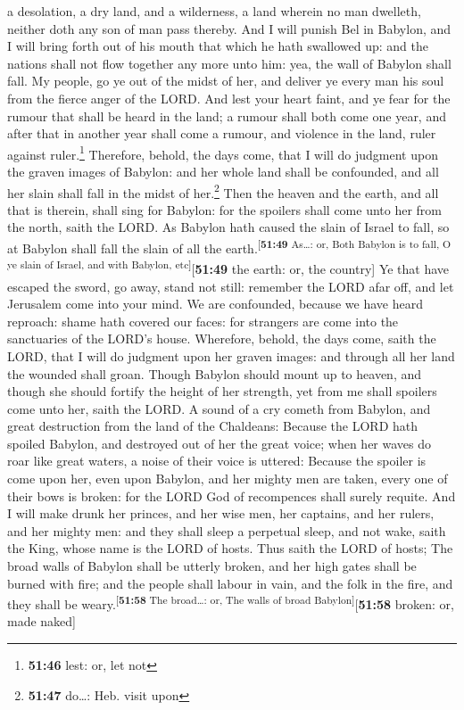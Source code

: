 a desolation, a dry land, and a wilderness, a land wherein no man
dwelleth, neither doth any son of man pass thereby.  And
I will punish Bel in Babylon, and I will bring forth out of his mouth
that which he hath swallowed up: and the nations shall not flow together
any more unto him: yea, the wall of Babylon shall fall. 
My people, go ye out of the midst of her, and deliver ye every man his
soul from the fierce anger of the LORD.  And lest your
heart faint, and ye fear for the rumour that shall be heard in the land;
a rumour shall both come one year, and after that in another year shall
come a rumour, and violence in the land, ruler against ruler.\footnote{\textbf{51:46}
  lest: or, let not}  Therefore, behold, the days come,
that I will do judgment upon the graven images of Babylon: and her whole
land shall be confounded, and all her slain shall fall in the midst of
her.\footnote{\textbf{51:47} do\ldots: Heb. visit upon} 
Then the heaven and the earth, and all that is therein, shall sing for
Babylon: for the spoilers shall come unto her from the north, saith the
LORD.  As Babylon hath caused the slain of Israel to
fall, so at Babylon shall fall the slain of all the
earth.\textsuperscript{{[}\textbf{51:49} As\ldots: or, Both Babylon is
to fall, O ye slain of Israel, and with Babylon,
etc{]}}{[}\textbf{51:49} the earth: or, the country{]} 
Ye that have escaped the sword, go away, stand not still: remember the
LORD afar off, and let Jerusalem come into your mind.  We
are confounded, because we have heard reproach: shame hath covered our
faces: for strangers are come into the sanctuaries of the LORD's house.
 Wherefore, behold, the days come, saith the LORD, that I
will do judgment upon her graven images: and through all her land the
wounded shall groan.  Though Babylon should mount up to
heaven, and though she should fortify the height of her strength, yet
from me shall spoilers come unto her, saith the LORD.  A
sound of a cry cometh from Babylon, and great destruction from the land
of the Chaldeans:  Because the LORD hath spoiled Babylon,
and destroyed out of her the great voice; when her waves do roar like
great waters, a noise of their voice is uttered:  Because
the spoiler is come upon her, even upon Babylon, and her mighty men are
taken, every one of their bows is broken: for the LORD God of
recompences shall surely requite.  And I will make drunk
her princes, and her wise men, her captains, and her rulers, and her
mighty men: and they shall sleep a perpetual sleep, and not wake, saith
the King, whose name is the LORD of hosts.  Thus saith
the LORD of hosts; The broad walls of Babylon shall be utterly broken,
and her high gates shall be burned with fire; and the people shall
labour in vain, and the folk in the fire, and they shall be
weary.\textsuperscript{{[}\textbf{51:58} The broad\ldots: or, The walls
of broad Babylon{]}}{[}\textbf{51:58} broken: or, made naked{]}

